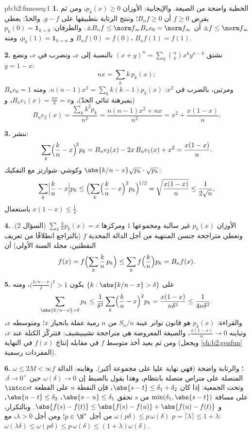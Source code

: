 \begin{solution}{pb:b2:funcseq:1}
\textbf{1.} الخطية واضحة من الصيغة. والإيجابية:
الأوزان $p_k(x) \geq 0$، ومن ثم يفرض $f \geq 0$ أن $B_nf \geq
0$؛ وتنتج الرتابة بتطبيقها على $g - f$. والحدّ: يعطي $\pm f \leq
\norm f_\infty$ أن $\pm B_nf \leq \norm f_\infty B_ne_0 =
\norm f_\infty$. والطرفان: $p_k(0) = \mathbf 1_{k=0}$ و
$p_k(1) = \mathbf 1_{k=n}$، ومنه $B_nf(0) = f(0)$، $B_nf(1) =
f(1)$.

\textbf{2.} نشتق $(x+y)^n = \sum_k\binom nk x^ky^{n-k}$
بالنسبة إلى $x$، ونضرب في $x$، ونضع $y = 1 - x$:
\[
nx = \sum_k k\,p_k(x) ;
\]
ومرتين، بالضرب في $x^2$: $n(n-1)x^2 = \sum_k k(k-1)p_k(x)$.
ومنه $B_ne_0 = 1$ (بمبرهنة ثنائي الحدّ)، و$B_ne_1(x) =
\frac{nx}{n} = x$، و
\[
B_ne_2(x) = \frac{\sum_k k^2p_k}{n^2}
= \frac{n(n-1)x^2 + nx}{n^2}
= x^2 + \frac{x(1-x)}{n} .
\]

\textbf{3.} ننشر:
\[
\sum_k\Bigl(\frac kn - x\Bigr)^{\!2} p_k
= B_ne_2(x) - 2x\,B_ne_1(x) + x^2
= \frac{x(1-x)}{n} .
\]
وكوشي--شوارتز مع التفكيك $\abs{k/n - x}\sqrt{p_k}
\cdot \sqrt{p_k}$:
\[
\sum_k\Bigl|\frac kn - x\Bigr| p_k
\leq \Bigl(\sum_k\Bigl(\frac kn - x\Bigr)^2
p_k\Bigr)^{\!1/2}
= \sqrt{\frac{x(1-x)}{n}} \leq \frac{1}{2\sqrt n},
\]
باستعمال $x(1-x) \leq \frac14$.

\textbf{4.} الأوزان $p_k(x)$ غير سالبة ومجموعها $1$
ومركزها $\sum_k \frac kn p_k(x) = x$ (السؤال 2). وتعطي
متراجحة جنسن المنتهية من أجل الدالة المحدبة $f$ (بالتراجع انطلاقًا من
تعريف النقطتين، مجلد السنة الأولى) أن
\[
f(x) = f\Bigl(\sum_k \frac kn\,p_k\Bigr)
\leq \sum_k f\Bigl(\frac kn\Bigr)p_k = B_nf(x) .
\]

\textbf{5.} على $\{k : \abs{k/n - x} > \delta\}$ يكون
$\bigl(\frac{k/n - x}{\delta}\bigr)^2 > 1$، ومنه
\[
\sum_{\abs{k/n-x}>\delta} p_k
\leq \frac{1}{\delta^2}\sum_k\Bigl(\frac kn -
x\Bigr)^2p_k
= \frac{x(1-x)}{n\delta^2} \leq \frac{1}{4n\delta^2} .
\]
والقراءة: $p_k(x)$ هو قانون تواتر عينة $S_n/n$ من
$n$ رمية عملة بانحياز $x$؛ ومتوسطه $x$، وتباينه
$\frac{x(1-x)}n \to 0$، والصيغة المعروضة هي متراجحة
تشيبيشيف: فتتركّز الكتلة عند $x$، ومن ثم يعيد أخذ متوسط $f$
في مقابله إنتاجَ $f(x)$ في النهاية
(ويجعل \cref{ch:b2:genfun} المفردات رسمية).

\textbf{6.} $\omega \leq 2M < \infty$؛ والرتابة واضحة
(فهي نهاية عليا على مجموعة أكبر). وهاينه: الدالة $f$ المتصلة على متراص
متصلة بانتظام، وهذا يقول بالضبط إن $\omega(\delta) \to 0$
حين $\delta \to 0^+$. وتحت الجمعية: إذا كان $\abs{s - t} \leq
\delta_1 + \delta_2$، فإن النقطة $u$ على القطعة $\intcc st$
على مسافة $\min(\delta_1, \abs{s-t})$ من $s$ تحقق
$\abs{s-u} \leq \delta_1$، $\abs{u-t} \leq \delta_2$، و
$\abs{f(s)-f(t)} \leq \abs{f(s)-f(u)} + \abs{f(u)-f(t)}$.
وبالتكرار، $\omega(p\delta) \leq p\,\omega(\delta)$ من أجل $p \in
\N^*$؛ ومن أجل $\lambda > 0$، مع $p = \lceil\lambda\rceil \leq 1
+ \lambda$: $\omega(\lambda\delta) \leq \omega(p\delta) \leq
p\,\omega(\delta) \leq (1+\lambda)\omega(\delta)$.


\end{solution}
